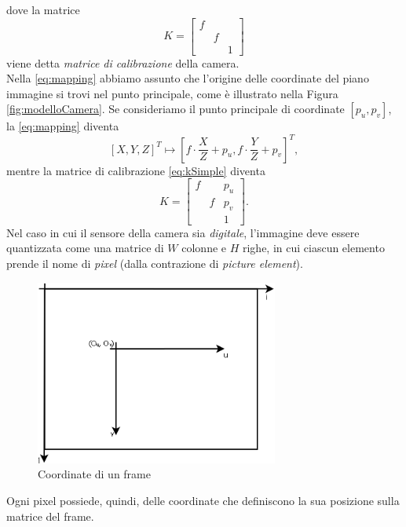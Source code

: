 dove la matrice
\begin{equation}
\label{eq:kSimple}
K = 
\left[\begin{array}{rccl}
f & & \\
& f & \\
& & 1 
\end{array}\right]
\end{equation}
viene detta \textit{matrice di calibrazione} della camera.\\
Nella \eqref{eq:mapping} abbiamo assunto che l'origine delle coordinate del piano immagine si trovi nel punto principale, come \`e illustrato nella Figura \ref{fig:modelloCamera}.
Se consideriamo il punto principale di coordinate $[p_u, p_v]$, la \eqref{eq:mapping} diventa
 \begin{equation}
 \label{eq:mappingGeneral}
 [X,Y,Z]^\textit{T} \mapsto \left[f\cdot \frac{X}{Z}+p_u, f\cdot \frac{Y}{Z}+p_v\right]^\textit{T},
 \end{equation}
 mentre la matrice di calibrazione \eqref{eq:kSimple} diventa 
 \begin{equation}
 \label{eq:kGeneral}
 K =
  \left[\begin{array}{rcl}
  f & & p_u \\
  & f & p_v \\
  & & 1 
  \end{array}\right].
 \end{equation}
 Nel caso in cui il sensore della camera sia \textit{digitale}, l'immagine deve essere quantizzata come una matrice di $W$ colonne e $H$ righe, in cui ciascun elemento prende il nome di \textit{pixel} (dalla contrazione di \textit{picture element}).
 \begin{figure}[tb]
 	\centering
 	\includegraphics[width=8cm]{./pictures/griglia}
 	\caption{Coordinate di un frame}
 	\label{fig:griglia}
 \end{figure}
 Ogni pixel possiede, quindi, delle coordinate che definiscono la sua posizione sulla matrice del frame.
